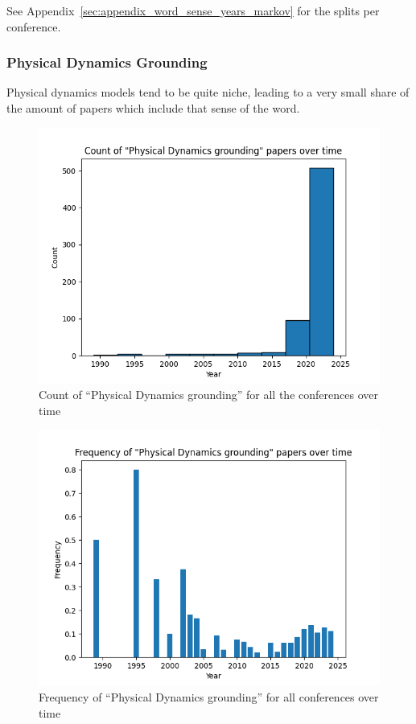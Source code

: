 \documentclass[11pt]{article}
\begin{document}
See Appendix~\ref{sec:appendix_word_sense_years_markov} for the splits per conference.

\subsubsection{Physical Dynamics Grounding}
Physical dynamics models tend to be quite niche, leading to a very small share of the amount of papers which include that sense of the word.

\begin{figure}[h!]
  \includegraphics[width=\columnwidth]{figs/grounding_figs/Physical Dynamics/all_confs_grounding_Physical Dynamics.png}
  \caption{Count of ``Physical Dynamics grounding'' for all the conferences over time}
  \label{fig:dynamics_all_confs_count}
\end{figure}

\begin{figure}[h!]
  \includegraphics[width=\columnwidth]{figs/freq_grounding_figs/Physical Dynamics/all_confs_grounding_Physical Dynamics.png}
  \caption{Frequency of ``Physical Dynamics grounding'' for all conferences over time}
  \label{fig:dynamics_all_confs_freq}
\end{figure}
\end{document}
